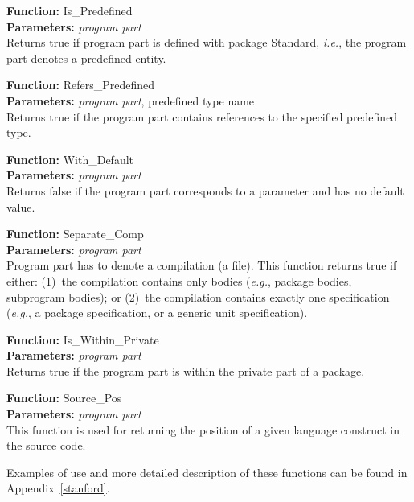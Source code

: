 {\bf Function:} Is\_Predefined\\
{\bf Parameters:} {\it program part}\\
Returns true if program part is defined with package Standard, {\it i.e.},
the program part denotes a predefined entity.

{\bf Function:} Refers\_Predefined\\
{\bf Parameters:} {\it program part}, predefined type name\\ 
Returns true if the program part contains references to the specified
predefined type.

{\bf Function:} With\_Default\\
{\bf Parameters:} {\it program part}\\
Returns false if the program part corresponds to a parameter
and has no default value.

{\bf Function:} Separate\_Comp\\
{\bf Parameters:} {\it program part}\\
Program part has to denote a compilation (a file).  This function returns
true if either: (1)~the compilation contains only bodies ({\it e.g.},
package bodies, subprogram bodies); or (2)~the compilation contains
exactly one specification ({\it e.g.}, a package specification, or a
generic unit specification).

{\bf Function:} Is\_Within\_Private\\
{\bf Parameters:} {\it program part}\\
Returns true if the program part is within the private part of
a package.

{\bf Function:} Source\_Pos\\
{\bf Parameters:} {\it program part}\\
This function is used for returning the position of a
given language construct in the source code.

\vspace{4pt}

Examples of use and more detailed description of these functions can
be found in Appendix~\ref{stanford}.
